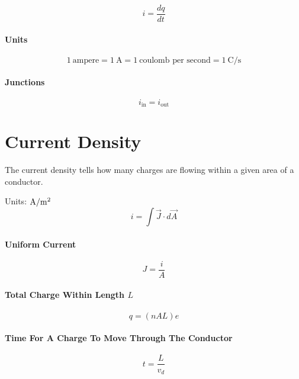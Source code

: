 \documentclass{article}
\begin{document}
        \begin{equation}
            i = \frac{dq}{dt}
        \end{equation}

        \paragraph{Units}
        \begin{equation}
            \SI{1}{\text{ampere}} = \SI{1}{\ampere} = \SI{1}{\text{coulomb per second}} = \SI[per-mode=symbol]{1}{\coulomb\per\second} \nonumber
        \end{equation}

        \paragraph{Junctions}
        \begin{equation}
            i_\text{in} = i_\text{out}
        \end{equation}

    \section{Current Density}

        The current density tells how many charges are flowing within a given area of a conductor.

        Units: $\si[per-mode=symbol]{\ampere\per\square\meter}$
        \begin{equation}
            i = \int \vec{J} \cdot d\vec{A}
        \end{equation}

        \paragraph{Uniform Current}
        \begin{equation}
            J = \frac{i}{A}
        \end{equation}

        \paragraph{Total Charge Within Length $L$}
        \begin{equation}
            q = \left( n A L \right) e
        \end{equation}

        \paragraph{Time For A Charge To Move Through The Conductor}
        \begin{equation}
            t = \frac{L}{v_d}
        \end{equation}
\end{document}
